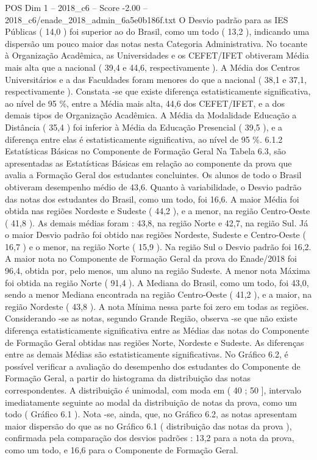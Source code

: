 \begin{textsample}{POS Dim 1 – 2018\_c6 – Score -2.00 – 2018\_c6/enade\_2018\_admin\_6a5e0b186f.txt}
O Desvio padrão para as IES Públicas ( 14,0 ) foi superior ao do Brasil, como um todo ( 13,2 ), indicando uma dispersão um pouco maior das notas nesta Categoria Administrativa.
No tocante à Organização Acadêmica, as Universidades e os CEFET/IFET obtiveram Média mais alta que a nacional ( 39,4 e 44,6, respectivamente ).
A Média dos Centros Universitários e a das Faculdades foram menores do que a nacional ( 38,1 e 37,1, respectivamente ).
Constata -se que existe diferença estatisticamente significativa, ao nível de 95 \%, entre a Média mais alta, 44,6 dos CEFET/IFET, e a dos demais tipos de Organização Acadêmica.
A Média da Modalidade Educação a Distância ( 35,4 ) foi inferior à Média da Educação Presencial ( 39,5 ), e a diferença entre elas é estatisticamente significativa, ao nível de 95 \%. 6.1.2 Estatísticas Básicas no Componente de Formação Geral Na Tabela 6.3, são apresentadas as Estatísticas Básicas em relação ao componente da prova que avalia a Formação Geral dos estudantes concluintes.
Os alunos de todo o Brasil obtiveram desempenho médio de 43,6.
Quanto à variabilidade, o Desvio padrão das notas dos estudantes do Brasil, como um todo, foi 16,6.
A maior Média foi obtida nas regiões Nordeste e Sudeste ( 44,2 ), e a menor, na região Centro-Oeste ( 41,8 ).
As demais médias foram : 43,8, na região Norte e 42,7, na região Sul.
Já o maior Desvio padrão foi obtido nas regiões Nordeste, Sudeste e Centro-Oeste ( 16,7 ) e o menor, na região Norte ( 15,9 ).
Na região Sul o Desvio padrão foi 16,2.
A maior nota no Componente de Formação Geral da prova do Enade/2018 foi 96,4, obtida por, pelo menos, um aluno na região Sudeste.
A menor nota Máxima foi obtida na região Norte ( 91,4 ).
A Mediana do Brasil, como um todo, foi 43,0, sendo a menor Mediana encontrada na região Centro-Oeste ( 41,2 ), e a maior, na região Nordeste ( 43,8 ).
A nota Mínima nessa parte foi zero em todas as regiões.
Considerando -se as notas, segundo Grande Região, observa -se que não existe diferença estatisticamente significativa entre as Médias das notas do Componente de Formação Geral obtidas nas regiões Norte, Nordeste e Sudeste.
As diferenças entre as demais Médias são estatisticamente significativas.
No Gráfico 6.2, é possível verificar a avaliação do desempenho dos estudantes do Componente de Formação Geral, a partir do histograma da distribuição das notas correspondentes.
A distribuição é unimodal, com moda em ( 40 ; 50 ], intervalo imediatamente seguinte ao modal da distribuição de notas da prova, como um todo ( Gráfico 6.1 ).
Nota -se, ainda, que, no Gráfico 6.2, as notas apresentam maior dispersão do que as no Gráfico 6.1 ( distribuição das notas da prova ), confirmada pela comparação dos desvios padrões : 13,2 para a nota da prova, como um todo, e 16,6 para o Componente de Formação Geral.

\end{textsample}
